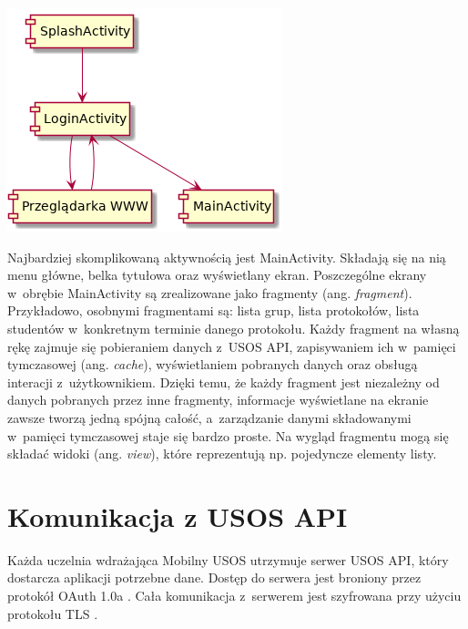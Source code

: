 \documentclass{pracamgr}
\begin{document}
\begingroup
\centering
\includegraphics[scale=0.5]{img/activities.png}
\label{fig:activities}
\medskip
\endgroup

Najbardziej skomplikowaną aktywnością jest MainActivity. Składają się na nią
menu główne, belka tytułowa oraz wyświetlany ekran. Poszczególne ekrany w~obrębie
MainActivity są zrealizowane jako fragmenty (ang. \textit{fragment}). Przykładowo,
osobnymi fragmentami są: lista grup, lista protokołów, lista studentów w~konkretnym
terminie danego protokołu. Każdy fragment na własną rękę zajmuje się pobieraniem
danych z~USOS API, zapisywaniem ich w~pamięci tymczasowej (ang. \textit{cache}),
wyświetlaniem pobranych danych oraz obsługą interacji z~użytkownikiem. Dzięki temu,
że każdy fragment jest niezależny od danych pobranych przez inne fragmenty, informacje
wyświetlane na ekranie zawsze tworzą jedną spójną całość, a~zarządzanie danymi
składowanymi w~pamięci tymczasowej staje się bardzo proste. Na wygląd fragmentu mogą się
składać widoki (ang. \textit{view}), które reprezentują np. pojedyncze elementy
listy.

\section{Komunikacja z USOS API}

Każda uczelnia wdrażająca Mobilny USOS utrzymuje serwer USOS API, który dostarcza
aplikacji potrzebne dane. Dostęp do serwera jest broniony przez protokół
OAuth 1.0a \cite{oauth}. Cała komunikacja z~serwerem jest szyfrowana przy użyciu
protokołu TLS \cite{tls12}.
\end{document}
